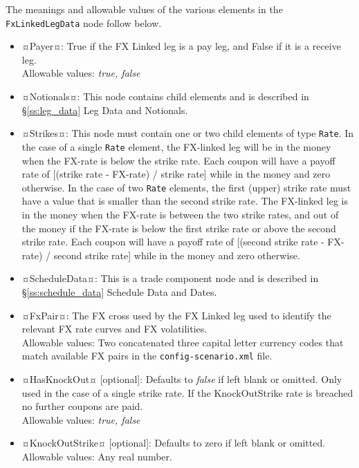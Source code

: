 The meanings and allowable values of the various elements in the \lstinline!FxLinkedLegData!  node follow below. 

\begin{itemize}
\item ¤Payer¤: True if the FX Linked leg is a pay leg, and False if it is a receive leg. \\ Allowable values:  \emph{true, false}
\item ¤Notionals¤: This node contains child elements and is described in \S \ref{ss:leg_data} Leg Data and Notionals. 
\item ¤Strikes¤: This node must contain one or two child elements of type \lstinline!Rate!.  In the case of a single \lstinline!Rate! element, the FX-linked leg will be in the money when the FX-rate is below the strike rate.   Each coupon will have a payoff rate of [(strike rate - FX-rate) / strike rate] while in the money and zero otherwise.  
In the case of two \lstinline!Rate! elements, the first (upper) strike rate must have a value that is smaller than the second strike rate.  The FX-linked leg is in the money when the FX-rate is between the two strike rates, and out of the money if the FX-rate is below the first strike rate or above the second strike rate.    Each coupon will have a payoff rate of [(second strike rate - FX-rate) / second strike rate] while in the money and zero otherwise.  

\item ¤ScheduleData¤: This is a trade component node and is described in \S \ref{ss:schedule_data} Schedule Data and Dates.   
\item ¤FxPair¤: The FX cross used by the FX Linked leg used to identify the relevant FX rate curves and FX volatilities. \\ Allowable values:  Two concatenated three capital letter currency codes that match available FX pairs in the {\tt config-scenario.xml} file.
\item ¤HasKnockOut¤ [optional]: Defaults to \emph{false} if left blank or omitted. Only used in the case of a single strike rate. If the KnockOutStrike rate is breached no further coupons are paid. \\ Allowable values:  \emph{true, false}
\item ¤KnockOutStrike¤ [optional]: Defaults to zero if left blank or omitted. \\ Allowable values:  Any real number.


\end{itemize}

